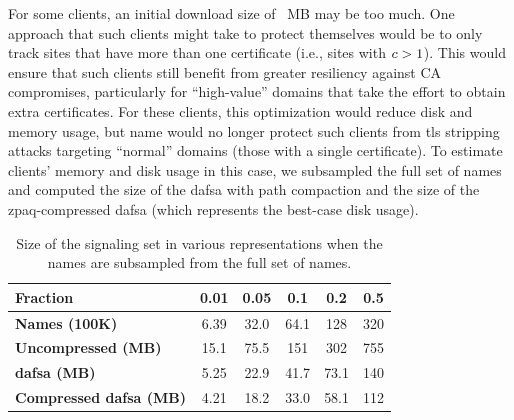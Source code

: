 
For some clients, an initial download size of \fsapczpaqmedsize{}~MB may be too
much. One approach that such clients might take to protect themselves would be
to only track sites that have more than one certificate (i.e., sites with
$c > 1$). This would ensure that such clients still benefit from greater
resiliency against CA compromises, particularly for ``high-value'' domains that
take the effort to obtain extra certificates. For these clients, this
optimization would reduce disk and memory usage, but \ac{name} would
no longer protect such clients from \ac{tls} stripping attacks targeting
``normal'' domains (those with a single certificate). To estimate clients'
memory and disk usage in this case, we subsampled the full set of names and
computed the size of the \ac{dafsa} with path compaction 
and the size of the zpaq-compressed
\ac{dafsa} (which represents the best-case disk usage).

\begin{table}[tbp]
  \centering
  \small
  \caption{Size of the signaling set in various representations when the names
  are subsampled from the full set of names.}
  \vspace{-2mm}
  \begin{tabular}{|lccccc|}
    \toprule
    \textbf{Fraction} & \textbf{0.01} & \textbf{0.05} & \textbf{0.1} &
    \textbf{0.2} & \textbf{0.5} \\
    \midrule
    \textbf{Names (100K)} & 6.39 & 32.0 & 64.1 & 128 & 320 \\
    \midrule
    \textbf{Uncompressed (MB)} & 15.1 & 75.5 & 151 & 302 & 755 \\
    \textbf{\ac{dafsa} (MB)} & 5.25 & 22.9 & 41.7 & 73.1 & 140 \\
    \textbf{Compressed \ac{dafsa} (MB)} & 4.21 & 18.2 & 33.0 & 58.1 & 112 \\
    \bottomrule
  \end{tabular}
  \vspace{-4mm}
  \label{tab:sample}
\end{table}


